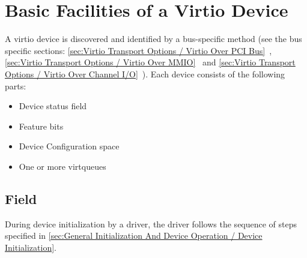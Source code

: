 \chapter{Basic Facilities of a Virtio Device}\label{sec:Basic Facilities of a Virtio Device}

A virtio device is discovered and identified by a bus-specific method
(see the bus specific sections: \ref{sec:Virtio Transport Options / Virtio Over PCI Bus}~,
\ref{sec:Virtio Transport Options / Virtio Over MMIO}~ and \ref{sec:Virtio Transport Options / Virtio Over Channel I/O}~).  Each
device consists of the following parts:

\begin{itemize}
\item Device status field
\item Feature bits
\item Device Configuration space
\item One or more virtqueues
\end{itemize}

\section{ Field}\label{sec:Basic Facilities of a Virtio Device / Device Status Field}
During device initialization by a driver,
the driver follows the sequence of steps specified in
\ref{sec:General Initialization And Device Operation / Device
Initialization}.

